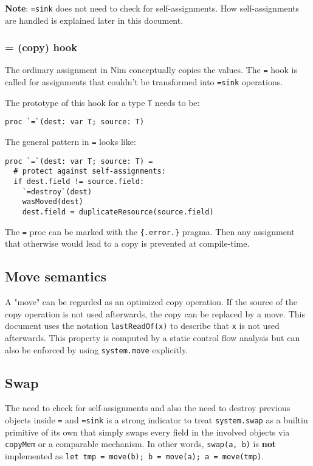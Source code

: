 \textbf{Note}: \texttt{=sink} does not need to check for
self-assignments. How self-assignments are handled is explained later in
this document.

\hypertarget{copy-hook}{%
\subsubsection{\texorpdfstring{{=} (copy)
hook}{= (copy) hook}}\label{copy-hook}}

The ordinary assignment in Nim conceptually copies the values. The
\texttt{=} hook is called for assignments that couldn't be transformed
into \texttt{=sink} operations.

The prototype of this hook for a type \texttt{T} needs to be:

\begin{verbatim}
proc `=`(dest: var T; source: T)
\end{verbatim}

The general pattern in \texttt{=} looks like:

\begin{verbatim}
proc `=`(dest: var T; source: T) =
  # protect against self-assignments:
  if dest.field != source.field:
    `=destroy`(dest)
    wasMoved(dest)
    dest.field = duplicateResource(source.field)
\end{verbatim}

The \texttt{=} proc can be marked with the \texttt{\{.error.\}} pragma.
Then any assignment that otherwise would lead to a copy is prevented at
compile-time.

\hypertarget{move-semantics}{%
\subsection{Move semantics}\label{move-semantics}}

A "move" can be regarded as an optimized copy operation. If the source
of the copy operation is not used afterwards, the copy can be replaced
by a move. This document uses the notation \texttt{lastReadOf(x)} to
describe that \texttt{x} is not used afterwards. This property is
computed by a static control flow analysis but can also be enforced by
using \texttt{system.move} explicitly.

\hypertarget{swap}{%
\subsection{Swap}\label{swap}}

The need to check for self-assignments and also the need to destroy
previous objects inside \texttt{=} and \texttt{=sink} is a strong
indicator to treat \texttt{system.swap} as a builtin primitive of its
own that simply swaps every field in the involved objects via
\texttt{copyMem} or a comparable mechanism. In other words,
\texttt{swap(a,\ b)} is \textbf{not} implemented as
\texttt{let\ tmp\ =\ move(b);\ b\ =\ move(a);\ a\ =\ move(tmp)}.

